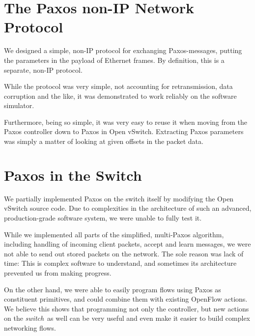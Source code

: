 \section{The Paxos non-IP Network Protocol}

We designed a simple, non-IP protocol for exchanging Paxos-messages, putting
the parameters in the payload of Ethernet frames.  By definition, this is a
separate, non-IP protocol.

While the protocol was very simple, not accounting for retransmission,
data corruption and the like, it was demonstrated to work reliably on the
software simulator.

Furthermore, being so simple, it was very easy to reuse it when moving from
the Paxos controller down to Paxos in Open vSwitch.  Extracting Paxos
parameters was simply a matter of looking at given offsets in the packet
data.

\section{Paxos in the Switch}

We partially implemented Paxos on the switch itself by modifying the Open
vSwitch source code.  Due to complexities in the architecture of such an
advanced, production-grade software system, we were unable to fully test it.

While we implemented all parts of the simplified, multi-Paxos algorithm,
including handling of incoming client packets, accept and learn
messages, we were not able to send out stored packets on the network.
The sole reason was lack of time: This is complex software to understand,
and sometimes its architecture prevented us from making progress.

On the other hand, we were able to easily program flows using Paxos as
constituent primitives, and could combine them with existing OpenFlow
actions.  We believe this shows that programming not only the controller,
but new actions on the \textit{switch} as well can be very useful and even
make it easier to build complex networking flows.
